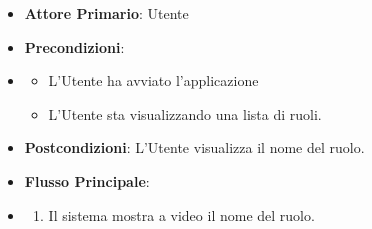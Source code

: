\begin{itemize}
      \item \textbf{Attore Primario}: Utente
      \item \textbf{Precondizioni}:
      \item \begin{itemize}
            \item L'Utente ha avviato l'applicazione
            \item L'Utente sta visualizzando una lista di ruoli.
      \end{itemize}
      \item \textbf{Postcondizioni}: L'Utente visualizza il nome del ruolo.
      \item \textbf{Flusso Principale}:
      \item \begin{enumerate}
            \item Il sistema mostra a video il nome del ruolo.
      \end{enumerate}
\end{itemize}

